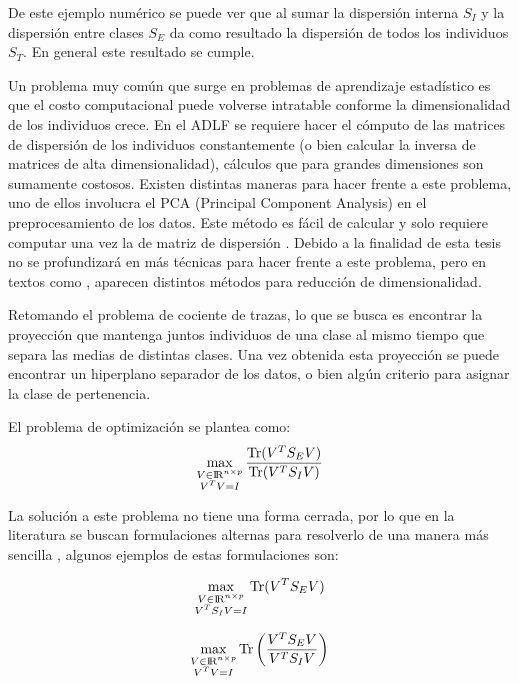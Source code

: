 De este ejemplo numérico se puede ver que al sumar la dispersión interna $S_I$ y la dispersión entre clases $S_E$ da como resultado la dispersión de todos los individuos $S_T$. En general este resultado se cumple.

Un problema muy común que surge en problemas de aprendizaje estadístico es que el costo computacional puede volverse intratable conforme la dimensionalidad de los individuos crece. En el ADLF se requiere hacer el cómputo de las matrices de dispersión de los individuos constantemente (o bien calcular la inversa de matrices de alta dimensionalidad), cálculos que para grandes dimensiones son sumamente costosos. Existen distintas maneras para hacer frente a este problema, uno de ellos involucra el PCA (Principal Component Analysis) en el preprocesamiento de los datos. Este método es fácil de calcular y solo requiere computar una vez la de matriz de dispersión \cite{ngo2012trace}. Debido a la finalidad de esta tesis no se profundizará en más técnicas para hacer frente a este problema, pero en textos como \cite{hastie2009elements}, \cite{duda2012pattern} aparecen distintos métodos para reducción de dimensionalidad.

Retomando el problema de cociente de trazas, lo que se busca es encontrar la proyección que mantenga juntos individuos de una clase al mismo tiempo que separa las medias de distintas clases. Una vez obtenida esta proyección se puede encontrar un hiperplano separador de los datos, o bien algún criterio para asignar la clase de pertenencia. 

\pagebreak
El problema de optimización se plantea como:
\begin{equation}\label{eq:2.5}
	\max_{\substack{V \in {\rm I\!R}^{n \times p} \\ V^TV = I}} \frac{\operatorname{Tr}(V^T S_E V)}{\operatorname{Tr}(V^T S_I V)} 	
\end{equation}

 La solución a este problema no tiene una forma cerrada, por lo que en la literatura se buscan formulaciones alternas para resolverlo de una manera más sencilla \cite{wang2007trace} \cite{fukunaga2013introduction}, algunos ejemplos de estas formulaciones son:

\begin{equation}\label{eq:2.6}
	\max_{\substack{V \in {\rm I\!R}^{n \times p} \\ V^T S_I V = I}} \operatorname{Tr}(V^T S_E V)
\end{equation}

\begin{equation} \label{eq:2.7}
	\max_{\substack{V \in {\rm I\!R}^{n \times p} \\ V^T V = I}} \operatorname{Tr}\left( \frac{V^T S_E V}{V^T S_I V}\right) 	
\end{equation}

